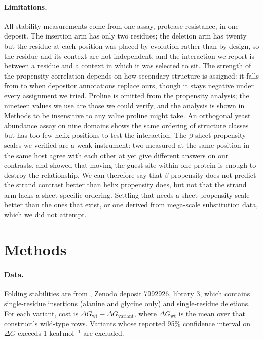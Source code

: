 \documentclass[11pt]{article}
\begin{document}
\paragraph{Limitations.} All stability measurements come from one assay, protease resistance, in
one deposit. The insertion arm has only two residues; the deletion arm has twenty but the residue
at each position was placed by evolution rather than by design, so the residue and its context are
not independent, and the interaction we report is between a residue and a context in which it was
selected to sit. The strength of the propensity correlation depends on how secondary structure is
assigned: it falls from \RhoPace{} to \SensDep{} when depositor annotations replace ours, though
it stays negative under every assignment we tried. Proline is omitted from the propensity
analysis; the nineteen values we use are
those we could verify, and the analysis is shown in Methods to be insensitive to any value
proline might take. An orthogonal yeast abundance assay on nine domains shows the same ordering of
structure classes but has too few helix positions to test the interaction. The $\beta$-sheet
propensity scales we verified are a weak instrument: two measured at the same position in the
same host agree with each other at \CollinMKSR{} yet give different answers on our contrasts,
and \citet{minorkim1994b} showed that moving the guest site within one protein is enough to
destroy the relationship. We can therefore say that $\beta$ propensity does not predict the
strand contrast better than helix propensity does, but not that the strand arm lacks a
sheet-specific ordering. Settling that needs a sheet propensity scale better than the ones that
exist, or one derived from mega-scale substitution data, which we did not attempt.

\section{Methods}

\paragraph{Data.} Folding stabilities are from \citet{tsuboyama2023}, Zenodo deposit 7992926,
library 3, which contains \NinsTot{} single-residue insertions (alanine and glycine only) and
\NdelTot{} single-residue deletions. For each variant, cost is
$\Delta G_{\mathrm{wt}} - \Delta G_{\mathrm{variant}}$, where $\Delta G_{\mathrm{wt}}$ is the mean
over that construct's wild-type rows. Variants whose reported 95\% confidence interval on
$\Delta G$ exceeds 1 kcal\,mol$^{-1}$ are excluded.
\end{document}
